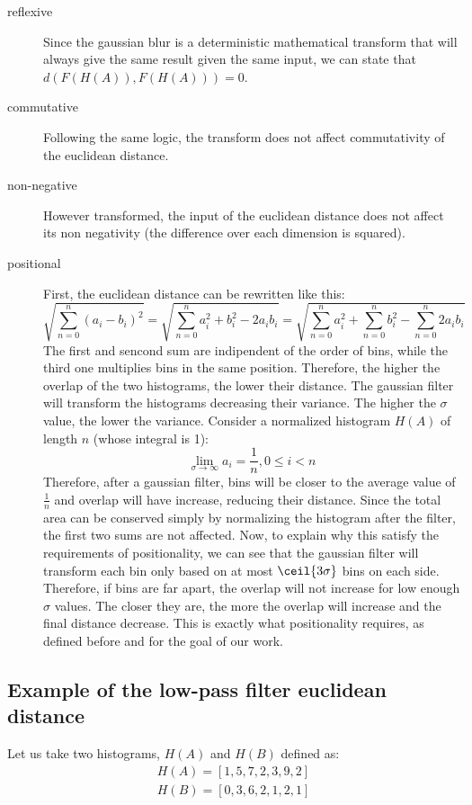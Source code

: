 \begin{description}
  \item[reflexive] Since the gaussian blur is a deterministic mathematical transform that will always give the same result given the same input, we can state that \\
    $d(F(H(A)), F(H(A))) = 0$.
  \item[commutative] Following the same logic, the transform does not affect commutativity of the euclidean distance.
  \item[non-negative]
    However transformed, the input of the euclidean distance does not affect its non negativity (the difference over each dimension is squared).
  \item[positional] First, the euclidean distance can be rewritten like this:
    $$\sqrt{\sum_{n=0}^{n} (a_i-b_i)^2} = \sqrt{\sum_{n=0}^{n} a_i^2+b_i^2-2a_ib_i} = \sqrt{\sum_{n=0}^{n} a_i^2 + \sum_{n=0}^{n} b_i^2 - \sum_{n=0}^{n} 2a_ib_i}$$
    The first and sencond sum are indipendent of the order of bins, while the third one multiplies bins in the same position. Therefore, the higher the overlap of the two histograms, the lower their distance. The gaussian filter will transform the histograms decreasing their variance. The higher the $\sigma$ value, the lower the variance. Consider a normalized histogram $H(A)$ of length $n$ (whose integral is 1):
      $$\lim_{\sigma\to\infty} a_i = \frac{1}{n}, 0 \leq i < n $$
      Therefore, after a gaussian filter, bins will be closer to the average value of $\frac{1}{n}$ and overlap will have increase, reducing their distance. Since the total area can be conserved simply by normalizing the histogram after the filter, the first two sums are not affected.
      Now, to explain why this satisfy the requirements of positionality, we can see that the gaussian filter will transform each bin only based on at most $\ceil{3\sigma}$ bins on each side. Therefore, if bins are far apart, the overlap will not increase for low enough $\sigma$ values. The closer they are, the more the overlap will increase and the final distance decrease. This is exactly what positionality requires, as defined before and for the goal of our work.
\end{description}

\subsection{Example of the low-pass filter euclidean distance}

Let us take two histograms, $H(A)$ and $H(B)$ defined as:
\begin{align}
  H(A) = [1,5,7,2,3,9,2]\\
  H(B) = [0,3,6,2,1,2,1]
\end{align}

